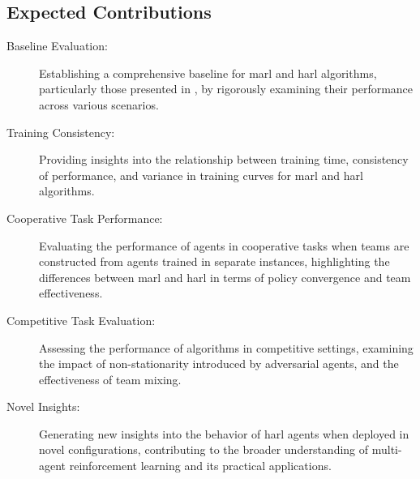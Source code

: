 \subsection{Expected Contributions}
\begin{description}
    \item[Baseline Evaluation:] 
    Establishing a comprehensive baseline for \gls{marl} and \gls{harl} algorithms, 
    particularly those presented in \cite{zhong2024}, by rigorously examining their 
    performance across various scenarios.
    \item[Training Consistency:] 
    Providing insights into the relationship between training time, consistency of performance, 
    and variance in training curves for \gls{marl} and \gls{harl} algorithms.
    \item[Cooperative Task Performance:] 
    Evaluating the performance of agents in cooperative tasks when teams are constructed from 
    agents trained in separate instances, highlighting the differences between 
    \gls{marl} and \gls{harl} in terms of policy convergence and team effectiveness.
    \item[Competitive Task Evaluation:] 
    Assessing the performance of algorithms in competitive settings, examining the impact of 
    non-stationarity introduced by adversarial agents, and the effectiveness of team mixing.
    \item[Novel Insights:] 
    Generating new insights into the behavior of \gls{harl} agents when deployed in novel 
    configurations, contributing to the broader understanding of multi-agent reinforcement 
    learning and its practical applications.
    \item[] 
\end{description}





\begin{comment}
For each proposed contribution:
\begin{itemize}
    \item Motivation and the specific problem. (Call back to the appropriate references.)
    \item Specify the academic contributions (Bulleted format makes it easier and clearer)
    \item Summary of specific methodology to be employed
    \begin{itemize}
        \item Expected obstacles
        \item Sources
    \end{itemize}
    \item Expected results. That is, the expected implications of whatever the results will be. 
    We aren't predicting the answer to the questions, just what the answers will tell us.
    \begin{itemize}
        \item Practical implications
        \item Theoretical implications
    \end{itemize}
\end{itemize}
\end{comment}

